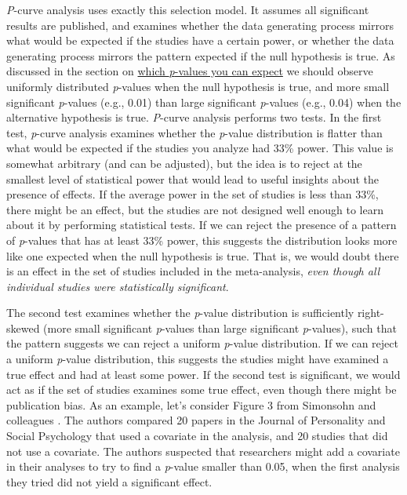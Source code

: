 \documentclass[
  oneside]{krantz}
\begin{document}
\emph{P}-curve analysis uses exactly this selection model. It assumes all significant results are published, and examines whether the data generating process mirrors what would be expected if the studies have a certain power, or whether the data generating process mirrors the pattern expected if the null hypothesis is true. As discussed in the section on \protect\hyperlink{whichpexpect}{which \emph{p}-values you can expect} we should observe uniformly distributed \emph{p}-values when the null hypothesis is true, and more small significant \emph{p}-values (e.g., 0.01) than large significant \emph{p}-values (e.g., 0.04) when the alternative hypothesis is true. \emph{P}-curve analysis performs two tests. In the first test, \emph{p}-curve analysis examines whether the \emph{p}-value distribution is flatter than what would be expected if the studies you analyze had 33\% power. This value is somewhat arbitrary (and can be adjusted), but the idea is to reject at the smallest level of statistical power that would lead to useful insights about the presence of effects. If the average power in the set of studies is less than 33\%, there might be an effect, but the studies are not designed well enough to learn about it by performing statistical tests. If we can reject the presence of a pattern of \emph{p}-values that has at least 33\% power, this suggests the distribution looks more like one expected when the null hypothesis is true. That is, we would doubt there is an effect in the set of studies included in the meta-analysis, \emph{even though all individual studies were statistically significant}.

The second test examines whether the \emph{p}-value distribution is sufficiently right-skewed (more small significant \emph{p}-values than large significant \emph{p}-values), such that the pattern suggests we can reject a uniform \emph{p}-value distribution. If we can reject a uniform \emph{p}-value distribution, this suggests the studies might have examined a true effect and had at least some power. If the second test is significant, we would act as if the set of studies examines some true effect, even though there might be publication bias. As an example, let's consider Figure 3 from Simonsohn and colleagues \citeyearpar{simonsohn_p-curve_2014}. The authors compared 20 papers in the Journal of Personality and Social Psychology that used a covariate in the analysis, and 20 studies that did not use a covariate. The authors suspected that researchers might add a covariate in their analyses to try to find a \emph{p}-value smaller than 0.05, when the first analysis they tried did not yield a significant effect.
\end{document}
